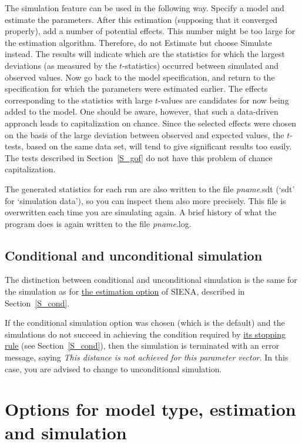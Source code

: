 \documentclass[a4paper,fleqn]{article}
\newcommand{\+}{\, + \,}
\newcommand{\si}{{\sf SIENA}}
\begin{document}
{The simulation feature can be used in the following way. Specify a
model and estimate the parameters. After this estimation
(supposing that it converged properly), add a number of potential
effects. This number might be too large for the estimation
algorithm. Therefore, do not {\sf Estimate} but choose {\sf
Simulate} instead. The results will indicate which are the
statistics for which the largest deviations (as measured by the
$t$-statistics) occurred between simulated and observed values.
Now go back to the model specification, and return to the
specification for which the parameters were estimated earlier. The
effects corresponding to the statistics with large $t$-values are
candidates for now being added to the model. One should be aware,
however, that such a data-driven approach leads to capitalization
on chance. Since the selected effects were chosen on the basis of
the large deviation between observed and expected values, the
$t$-tests, based on the same data set, will tend to give
significant results too easily.
The tests described in Section~\ref{S_gof} do not have this
problem of chance capitalization.

The generated statistics for each run are also written to the file
\textsf{{\em pname}.sdt} (`sdt' for `simulation data'), so you can
inspect them also more precisely. This file is overwritten each
time you are simulating again. A brief history of what the program
does is again written to the file \textsf{{\em pname}.log}.

\subsection{Conditional and unconditional simulation}

The distinction between conditional and unconditional simulation
is the same for the simulation as for
\hyperlink{T_S_cond}{the estimation option}
of \si, described in Section~\ref{S_cond}.

If the conditional simulation option was chosen (which is the
default) and the simulations do not succeed in achieving the
condition required by
\hyperlink{T_distance_stop}{its stopping rule}
(see Section~\ref{S_cond}), then the simulation is
terminated with an error message, saying {\em This distance is not
achieved for this parameter vector}. In this case, you are advised
to change to unconditional simulation.

\begin{print}
\newpage
\end{print}
\section[Options for model type, estimation and simulation]{Options for model type, estimation and simulation}
\label{S_options}

}
\end{document}
